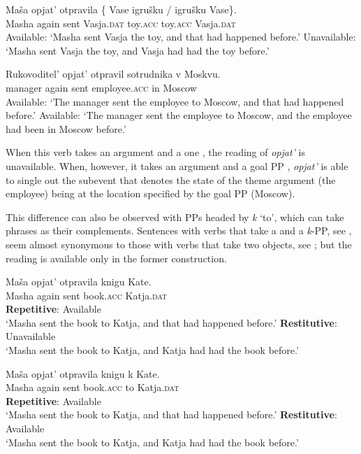 \documentclass[output=paper]{langscibook}
\begin{document}
 \ea\label{ex:bondarenko:21}
\gll Maša opjat’ otpravila \{\hspace{-2pt} Vase igrušku / igrušku Vase\}.\\
     Masha again sent {} Vasja.\textsc{dat} toy.\textsc{acc} {} toy.\textsc{acc} Vasja.\textsc{dat}\\
\ea  Available: `Masha sent Vasja the toy, and that had happened before.'
\ex Unavailable: `Masha sent Vasja the toy, and Vasja had had the toy before.'
\z
\z

 \ea\label{ex:bondarenko:22}
\gll Rukovoditel’ opjat’ otpravil sotrudnika v Moskvu.\\
     manager again sent employee.\textsc{acc} in Moscow\\
\ea     Available: `The manager sent the employee to Moscow, and that had   happened before.'
\ex     Available: `The manager sent the employee to Moscow, and the employee   had been in   Moscow before.'
\z
\z


\noindent When this verb takes an  argument and a  one , the  reading of \textit{opjat’} is unavailable. When, however, it takes an  argument and a goal PP , \textit{opjat’} is able to single out the subevent that denotes the state of the theme argument (the employee) being at the location specified by the goal PP (Moscow).


This difference can also be observed with PPs headed by \textit{k} ‘to’, which can take   phrases as their complements. Sentences with  verbs that take a  and a \textit{k}{}-PP, see , seem almost synonymous to those with  verbs that take two objects, see ; but the  reading is available only in the former construction.


 \ea\label{ex:bondarenko:23}
\gll Maša opjat’ otpravila knigu Kate.\\
     Masha again sent book.\textsc{acc} Katja.\textsc{dat}\\
\ea \textbf{Repetitive}: Available\\
`Masha sent the book to Katja, and that had happened before.'
\ex \textbf{Restitutive}: Unavailable\\
`Masha sent the book to Katja, and Katja had had the book   before.'
\z
\z

 \ea\label{ex:bondarenko:24}
\gll Maša opjat’ otpravila knigu k Kate.\\
     Masha again sent book.\textsc{acc} to Katja.\textsc{dat}\\
\ea \textbf{Repetitive}: Available\\
`Masha sent the book to Katja, and that had happened before.'
\ex \textbf{Restitutive}: Available\\
`Masha sent the book to Katja, and Katja had had the book   before.'
\z
\z
\end{document}
